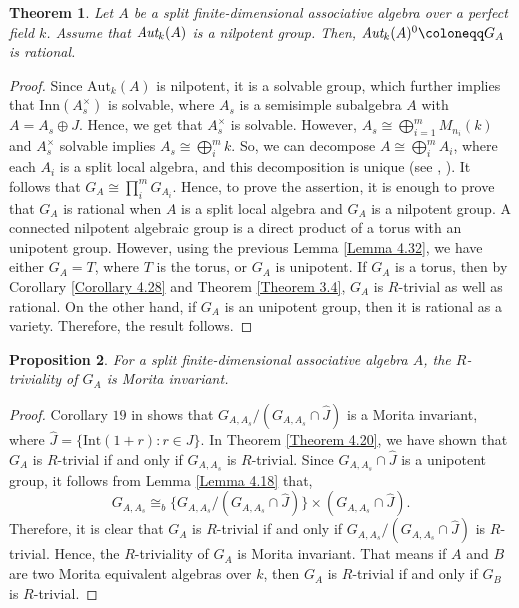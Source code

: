 \documentclass[12pt]{amsart}
\newtheorem{theorem}{Theorem}[section]
\newtheorem{proposition}[theorem]{Proposition}
\theoremstyle{definition}
\numberwithin{equation}{section}
\begin{document}
\vskip2mm

\begin{theorem}\label{Theorem 4.33}
Let $A$ be a split finite-dimensional associative algebra over a perfect field $k$. Assume that $\emph{\text{Aut}}_k(A)$ is a nilpotent group. Then, $\emph{\text{Aut}}_k(A)^{0}\coloneqq  G_A$ is rational.
\end{theorem}
\vskip1mm
\begin{proof}
Since $\text{Aut}_k(A)$ is nilpotent, it is a solvable group, which further implies that $\text{Inn}(A_s^{\times})$ is solvable, where $A_s$ is a semisimple subalgebra $A$ with $A=A_s\oplus J$. Hence, we get that $A_s^{\times}$ is solvable. However, $A_s\cong \bigoplus_{i=1}^{m}M_{n_i}(k)$ and $A_s^{\times}$ solvable implies $A_s\cong \bigoplus_{i}^{m} k$. So, we can decompose $A\cong \bigoplus_{i}^{m} A_i$, where each $A_i$ is a split local algebra, and this decomposition is unique (see \cite{Auslander}, \cite{Pierce}).
It follows that $G_A\cong\prod_{i}^{m}G_{A_{i}}$. Hence, to prove the assertion, it is enough to prove that $G_A$ is rational when $A$ is a split local algebra and $G_{A}$ is a nilpotent group. A connected nilpotent algebraic group is a direct product of a torus with an unipotent group. However, using the previous Lemma \ref{Lemma 4.32}, we have either $G_A=T$, where $T$ is the torus, or $G_A$ is unipotent. If $G_A$ is a torus, then by Corollary \ref{Corollary 4.28} and Theorem \ref{Theorem 3.4}, $G_A$ is $R$-trivial as well as rational. On the other hand, if $G_A$ is an unipotent group, then it is rational as a variety. Therefore, the result follows.
\end{proof}

\vskip2mm
\begin{proposition}\label{Proposition 4.34}
For a split finite-dimensional associative algebra $A$, the $R$-triviality of $G_{A}$ is Morita invariant.
\end{proposition}
\vskip1mm
\begin{proof}
Corollary $19$ in \cite{AS3} shows that $G_{A,A_s}/(G_{A,A_s}\cap \hat{J})$ is a Morita invariant, where $\hat{J}=\{\text{Int}(1+r):r\in J\}$. In Theorem \ref{Theorem 4.20}, we have shown that $G_A$ is $R$-trivial if and only if $G_{A, A_{s}}$ is $R$-trivial. Since $G_{A,A_s}\cap \hat{J}$ is a unipotent group, it follows from Lemma \ref{Lemma 4.18} that, \[G_{A,A_s}\cong_{b} \{G_{A,A_s}/(G_{A,A_s}\cap \hat{J})\} \times (G_{A,A_s}\cap \hat{J}).\] Therefore, it is clear that $G_A$ is $R$-trivial if and only if $G_{A,A_s}/(G_{A,A_s}\cap \hat{J})$ is $R$-trivial. Hence, the $R$-triviality of $G_{A}$ is Morita invariant. That means if $A$ and $B$ are two Morita equivalent algebras over $k$, then $G_{A}$ is $R$-trivial if and only if $G_{B}$ is $R$-trivial. 
 \end{proof}
\end{document}
